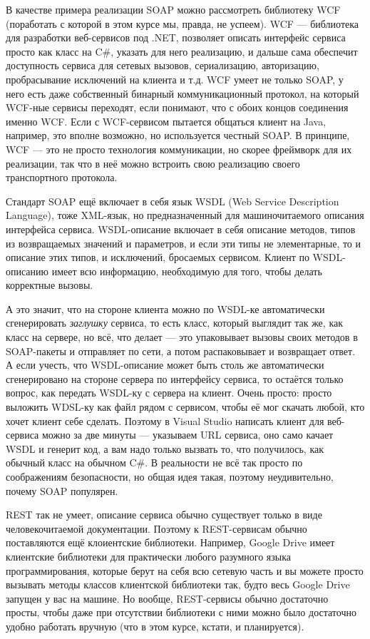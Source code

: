 \documentclass{../../text-style}
\begin{document}
В качестве примера реализации SOAP можно рассмотреть библиотеку WCF (поработать с которой в этом курсе мы, правда, не успеем). WCF --- библиотека для разработки веб-сервисов под .NET, позволяет описать интерфейс сервиса просто как класс на C\#, указать для него реализацию, и дальше сама обеспечит доступность сервиса для сетевых вызовов, сериализацию, авторизацию, пробрасывание исключений на клиента и т.д. WCF умеет не только SOAP, у него есть даже собственный бинарный коммуникационный протокол, на который WCF-ные сервисы переходят, если понимают, что с обоих концов соединения именно WCF. Если с WCF-сервисом пытается общаться клиент на Java, например, это вполне возможно, но используется честный SOAP. В принципе, WCF --- это не просто технология коммуникации, но скорее фреймворк для их реализации, так что в неё можно встроить свою реализацию своего транспортного протокола.

Стандарт SOAP ещё включает в себя язык WSDL (Web Service Description Language), тоже XML-язык, но предназначенный для машиночитаемого описания интерфейса сервиса. WSDL-описание включает в себя описание методов, типов из возвращаемых значений и параметров, и если эти типы не элементарные, то и описание этих типов, и исключений, бросаемых сервисом. Клиент по WSDL-описанию имеет всю информацию, необходимую для того, чтобы делать корректные вызовы. 

А это значит, что на стороне клиента можно по WSDL-ке автоматически сгенерировать \textit{заглушку} сервиса, то есть класс, который выглядит так же, как класс на сервере, но всё, что делает --- это упаковывает вызовы своих методов в SOAP-пакеты и отправляет по сети, а потом распаковывает и возвращает ответ. А если учесть, что WSDL-описание может быть столь же автоматически сгенерировано на стороне сервера по интерфейсу сервиса, то остаётся только вопрос, как передать WSDL-ку с сервера на клиент. Очень просто: просто выложить WDSL-ку как файл рядом с сервисом, чтобы её мог скачать любой, кто хочет клиент себе сделать. Поэтому в Visual Studio написать клиент для веб-сервиса можно за две минуты --- указываем URL сервиса, оно само качает WSDL и генерит код, а вам надо только вызвать то, что получилось, как обычный класс на обычном C\#. В реальности не всё так просто по соображениям безопасности, но общая идея такая, поэтому неудивительно, почему SOAP популярен.

REST так не умеет, описание сервиса обычно существует только в виде человекочитаемой документации. Поэтому к REST-сервисам обычно поставляются ещё клоиентские библиотеки. Например, Google Drive имеет клиентские библиотеки для практически любого разумного языка программирования, которые берут на себя всю сетевую часть и вы можете просто вызывать методы классов клиентской библиотеки так, будто весь Google Drive запущен у вас на машине. Но вообще, REST-сервисы обычно достаточно просты, чтобы даже при отсутствии библиотеки с ними можно было достаточно удобно работать вручную (что в этом курсе, кстати, и планируется).
\end{document}
